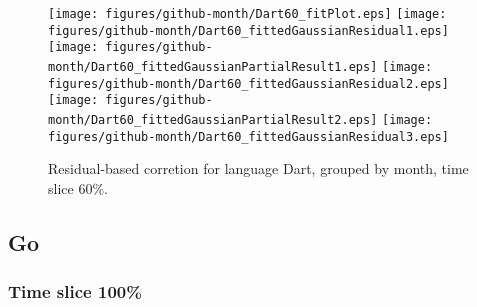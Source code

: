 \begin{figure}[t]
\centering
{}
{\texttt{[image: figures/github-month/Dart60\_fitPlot.eps]}}
{\texttt{[image: figures/github-month/Dart60\_fittedGaussianResidual1.eps]}}
{\texttt{[image: figures/github-month/Dart60\_fittedGaussianPartialResult1.eps]}}
{\texttt{[image: figures/github-month/Dart60\_fittedGaussianResidual2.eps]}}
{\texttt{[image: figures/github-month/Dart60\_fittedGaussianPartialResult2.eps]}}
{\texttt{[image: figures/github-month/Dart60\_fittedGaussianResidual3.eps]}}
\caption{Residual-based corretion for language Dart, grouped by month, time slice 60\%.}
\end{figure}


\FloatBarrier


\subsection{Go}

\subsubsection{Time slice 100\%}

